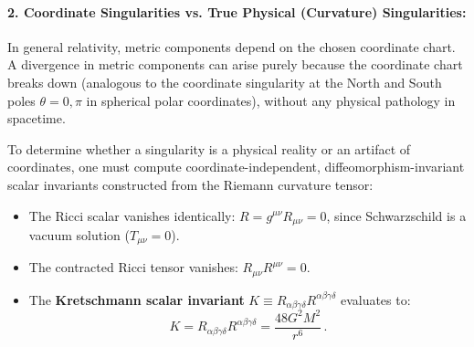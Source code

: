 \documentclass[12pt]{article}
\newcommand{\be}{\begin{equation}}
\newcommand{\ee}{\end{equation}}
\begin{document}
\paragraph{2. Coordinate Singularities vs. True Physical (Curvature) Singularities:}
In general relativity, metric components depend on the chosen coordinate chart. A divergence in metric components can arise purely because the coordinate chart breaks down (analogous to the coordinate singularity at the North and South poles $\theta=0,\pi$ in spherical polar coordinates), without any physical pathology in spacetime.

To determine whether a singularity is a physical reality or an artifact of coordinates, one must compute coordinate-independent, diffeomorphism-invariant scalar invariants constructed from the Riemann curvature tensor:
\begin{itemize}
    \item The Ricci scalar vanishes identically: $R = g^{\mu\nu} R_{\mu\nu} = 0$, since Schwarzschild is a vacuum solution ($T_{\mu\nu} = 0$).
    \item The contracted Ricci tensor vanishes: $R_{\mu\nu} R^{\mu\nu} = 0$.
    \item The \textbf{Kretschmann scalar invariant} $K \equiv R_{\alpha\beta\gamma\delta} R^{\alpha\beta\gamma\delta}$ evaluates to:
    \be
    K = R_{\alpha\beta\gamma\delta} R^{\alpha\beta\gamma\delta} = \frac{48 G^2 M^2}{r^6} \,.
    \label{eq:kretschmann}
    \ee
\end{itemize}
\end{document}
